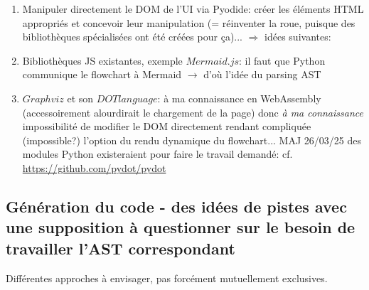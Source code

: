 \documentclass[11pt,a4paper]{article}
\begin{document}
\begin{enumerate}
    \item Manipuler directement le DOM de l'UI via Pyodide: créer les éléments HTML appropriés et concevoir leur manipulation (= réinventer la roue, puisque des bibliothèques spécialisées ont été créées pour ça)... $\Rightarrow$ idées suivantes:
    \item Bibliothèques JS existantes, exemple $Mermaid.js$: il faut que Python communique le flowchart à Mermaid $\rightarrow$ d'où l'idée du parsing AST
    \item $Graphviz$ et son $DOT language$: à ma connaissance en WebAssembly (accessoirement alourdirait le chargement de la page) donc \textit{à ma connaissance} impossibilité de modifier le DOM directement rendant compliquée (impossible?) l'option du rendu dynamique du flowchart... MAJ 26/03/25 des modules Python existeraient pour faire le travail demandé: cf. \url{https://github.com/pydot/pydot}
\end{enumerate}

\subsection{Génération du code - des idées de pistes avec une supposition à questionner sur le besoin de travailler l'AST correspondant}

Différentes approches à envisager, pas forcément mutuellement exclusives.
\end{document}
